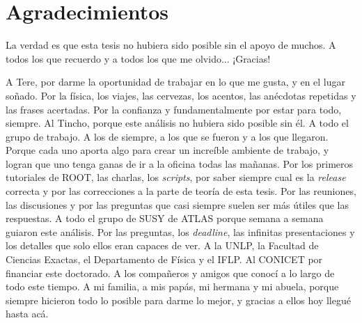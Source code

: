 \chapter*{Agradecimientos}

La verdad es que esta tesis no hubiera sido posible sin el
apoyo de muchos. A todos los que recuerdo y a todos
los que me olvido... ¡Gracias!

A Tere, por darme la oportunidad de trabajar en lo que me gusta, y en
el lugar so\~nado. Por la física, los viajes, las cervezas, los acentos,
las anécdotas repetidas y las frases acertadas. Por la confianza y
fundamentalmente por estar para todo, siempre.
Al Tincho, porque este análisis no hubiera sido posible sin él.
A todo el grupo de trabajo. A los de siempre, a los que se fueron y a los que
llegaron. Porque cada uno aporta algo para crear un increíble ambiente
de trabajo, y logran que uno tenga ganas de ir a la oficina todas las ma\~nanas. Por los
primeros tutoriales de ROOT, las charlas, los \emph{scripts}, por saber siempre cual
es la \emph{release} correcta y por las correcciones a la parte de teoría de esta tesis.
Por las reuniones, las discusiones y por las preguntas que casi siempre suelen ser más útiles
que las respuestas.
A todo el grupo de SUSY de ATLAS porque semana a semana guiaron este análisis.
Por las preguntas, los \emph{deadline}, las infinitas presentaciones y los detalles que solo ellos
eran capaces de ver.
A la UNLP, la Facultad de Ciencias Exactas, el Departamento de Física y el IFLP. Al CONICET por financiar
este doctorado.
A los compañeros y amigos que conocí a lo largo de todo este tiempo.
A mi familia, a mis papás, mi hermana y mi abuela, porque siempre hicieron todo lo posible
para darme lo mejor, y gracias a ellos hoy llegué hasta acá.

